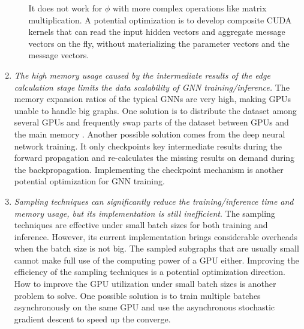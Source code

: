 \begin{enumerate}
\begin{itemize}
                    It does not work for $\phi$ with more complex operations like matrix multiplication.
                    A potential optimization is to develop composite CUDA kernels that can read the input hidden vectors and aggregate message vectors on the fly, without materializing the parameter vectors and the message vectors.
         \end{itemize}
    \item \emph{The high memory usage caused by the intermediate results of the edge calculation stage limits the data scalability of GNN training/inference.}
          The memory expansion ratios of the typical GNNs are very high, making GPUs unable to handle big graphs.
          One solution is to distribute the dataset among several GPUs and frequently swap parts of the dataset between GPUs and the main memory \cite{ma2019_neugraph}.
          Another possible solution \cite{chen2016_training_deep} comes from the deep neural network training. %
          It only checkpoints key intermediate results during the forward propagation and re-calculates the missing results on demand during the backpropagation.
          Implementing the checkpoint mechanism is another potential optimization for GNN training.

    \item \emph{Sampling techniques can significantly reduce the training/inference time and memory usage, but its implementation is still inefficient}.
          The sampling techniques are effective under small batch sizes for both training and inference.
          However, its current implementation brings considerable overheads when the batch size is not big.
          The sampled subgraphs that are usually small cannot make full use of the computing power of a GPU either.
          Improving the efficiency of the sampling techniques is a potential optimization direction.
          How to improve the GPU utilization under small batch sizes is another problem to solve.
          One possible solution is to train multiple batches asynchronously on the same GPU and use the asynchronous stochastic gradient descent to speed up the converge.
\end{enumerate}
